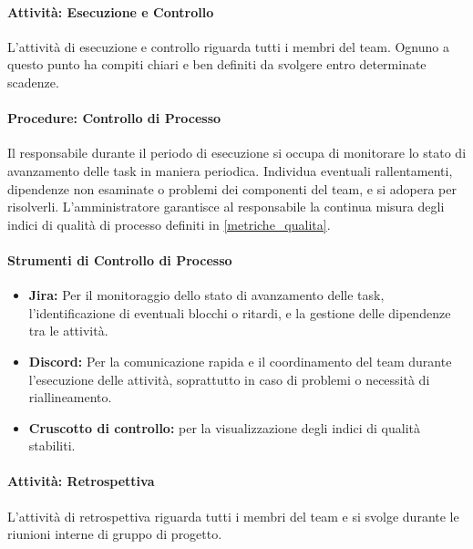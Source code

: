 \documentclass[a4paper,12pt]{article}
\begin{document}
\paragraph{Attività: Esecuzione e Controllo}
L'attività di esecuzione e controllo riguarda tutti i membri del team. Ognuno a questo punto ha compiti chiari e ben definiti da svolgere entro determinate scadenze.
\paragraph{Procedure: Controllo di Processo}
Il responsabile durante il periodo di esecuzione si occupa di monitorare lo stato di avanzamento delle task in maniera periodica. Individua eventuali rallentamenti, dipendenze non esaminate o problemi dei componenti del team, e si adopera per risolverli.
L'amministratore garantisce al responsabile la continua misura degli indici di qualità di processo definiti in \ref{metriche_qualita}.
\paragraph{Strumenti di Controllo di Processo}
\begin{itemize}
    \item \textbf{Jira:} Per il monitoraggio dello stato di avanzamento delle task, l'identificazione di eventuali blocchi o ritardi, e la gestione delle dipendenze tra le attività.
    \item \textbf{Discord:} Per la comunicazione rapida e il coordinamento del team durante l'esecuzione delle attività, soprattutto in caso di problemi o necessità di riallineamento.
    \item \textbf{Cruscotto di controllo:} per la visualizzazione degli indici di qualità stabiliti.
\end{itemize}

\paragraph{Attività: Retrospettiva}
L'attività di retrospettiva riguarda tutti i membri del team e si svolge durante le riunioni interne di gruppo di progetto.
\end{document}
